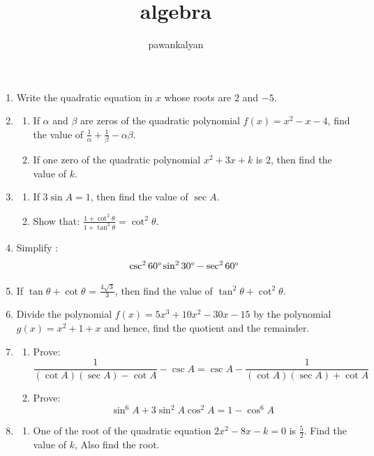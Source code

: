 \documentclass{article}
\begin{document}
\title{algebra}
\author{pawankalyan}
\maketitle

\begin{enumerate}
	\item Write the quadratic equation in $x$ whose roots are $2$ and $-5$.
	\item 
	\begin{enumerate}
		\item If $\alpha$ and $\beta$ are zeros of the quadratic polynomial $f(x) = x^2 - x - 4$, find the value of $\frac{1}{\alpha} + \frac{1}{\beta} - {\alpha \beta}$.
					
					
			
		\item If one zero of the quadratic polynomial $x^{2} + 3x + k$ is $2$, then find the value of $k$.
	\end{enumerate}
	\item 
	\begin{enumerate}
		\item If $3\sin A = 1$, then find the value of $\sec A$.

					

		\item Show that: $\frac{1 + \cot^2{\theta}}{1 + \tan^2{\theta}} = \cot^2{\theta}$.
	\end{enumerate}
\item Simplify :$${\csc^{2}{60\degree} \sin^{2}{30\degree} - \sec^{2}{60\degree}}$$
	\item If $\tan{\theta} + \cot{\theta}$ = $\frac{4 \sqrt{3}}{3}$, then find the value of $\tan^{2}{\theta} + \cot^{2}{\theta}$. 
	\item Divide the polynomial $f(x) = 5x^{3} + 10x^{2} - 30{x} - 15$ by the polynomial $g(x) = x^{2} + 1 + x$ and hence, find the quotient and the remainder.
	\item
	\begin{enumerate}
		\item Prove:$$\frac{1}{(\cot A)(\sec A) - \cot A} - \csc A = \csc A - \frac{1}{(\cot A)(\sec A) + \cot A}$$

					
		\item Prove:$$\sin^{6} A + 3\sin^{2} A \cos^{2} A = 1 - \cos^{6}  A$$
	\end{enumerate}
	\item
	\begin{enumerate}
		\item One of the root of the quadratic equation $2x^{2} - 8x - k = 0$ is $\frac{5}{2}$. Find the value of $k$, Also find the root.
					

\end{enumerate}
\end{enumerate}
\end{document}
